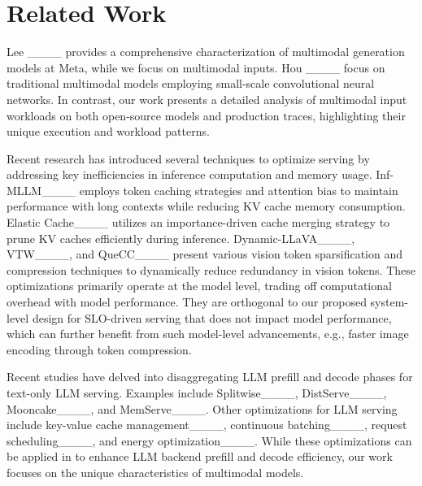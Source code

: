 \section{Related Work}
Lee \etal{}____ provides a comprehensive characterization of multimodal generation models at Meta, while we focus on multimodal inputs.
Hou \etal{}____ focus on traditional multimodal models employing small-scale convolutional neural networks.
In contrast, our work presents a detailed analysis of multimodal input workloads on both open-source \lmm models and production traces, highlighting their unique execution and workload patterns.

Recent research has introduced several techniques to optimize \lmm serving by addressing key inefficiencies in inference computation and memory usage.
Inf-MLLM____ employs token caching strategies and attention bias to maintain performance with long contexts while reducing KV cache memory consumption.
Elastic Cache____ utilizes an importance-driven cache merging strategy to prune KV caches efficiently during inference.
Dynamic-LLaVA____, VTW____, and QueCC____ present various vision token sparsification and compression techniques to dynamically reduce redundancy in vision tokens.
These optimizations primarily operate at the model level, trading off computational overhead with model performance.
They are orthogonal to our proposed system-level design for SLO-driven \lmm serving that does not impact model performance, which can further benefit from such model-level advancements, e.g., faster image encoding through token compression.

Recent studies have delved into disaggregating LLM prefill and decode phases for text-only LLM serving.
Examples include Splitwise____, DistServe____, Mooncake____, and MemServe____.
Other optimizations for LLM serving include key-value cache management____, continuous batching____, request scheduling____, and energy optimization____.
While these optimizations can be applied in \sysname{} to enhance LLM backend prefill and decode efficiency, our work focuses on the unique characteristics of multimodal models.